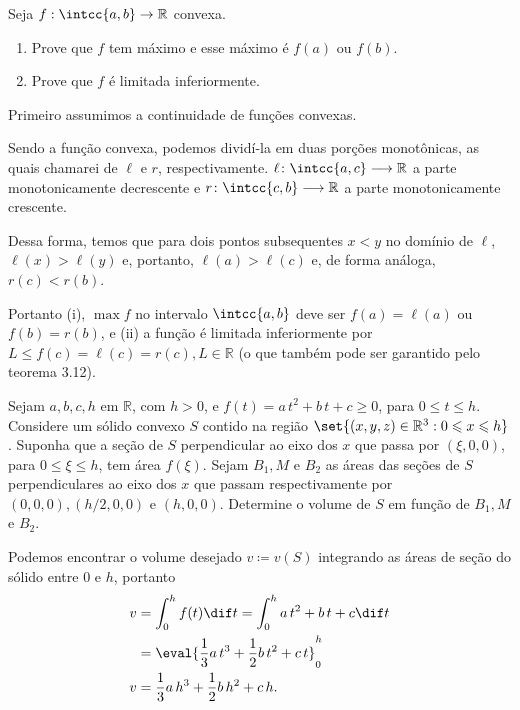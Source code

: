 \documentclass{IMTexam}
\begin{document}
\begin{questions}
		
		Seja $ f : \intcc{a,b} \to \mathbb{R} $ convexa.
		\begin{enumerate}[label=\roman*.]
			\item Prove que $ f $ tem máximo e esse máximo é $ f(a) $ ou $ f(b) $.
			\item Prove que $ f $ é limitada inferiormente.
		\end{enumerate}
	
		\begin{solution}
			Primeiro assumimos a continuidade de funções convexas.
			
			Sendo a função convexa, podemos dividí-la em duas porções monotônicas, as quais chamarei de $ \ell $ e $ r $, respectivamente. $ \ell\colon\intcc{a,c}\longrightarrow\mathbb{R} $ a parte monotonicamente decrescente e $ r\colon\intcc{c,b}\longrightarrow\mathbb{R} $ a parte monotonicamente crescente.
			
			Dessa forma, temos que para dois pontos subsequentes $ x<y $ no domínio de $ \ell $, $ \ell(x)>\ell(y) $ e, portanto, $ \ell(a)>\ell(c) $ e, de forma análoga, $ r(c)< r(b) $. 
			
			Portanto (i), $ \max f $ no intervalo $ \intcc{a,b} $ deve ser $ f(a)=\ell(a) $ ou $ f(b)=r(b) $, e (ii) a função é limitada inferiormente por $ L\leqslant f(c)=\ell(c)=r(c), L\in\mathbb{R} $ (o que também pode ser garantido pelo teorema 3.12).
		\end{solution}
		
		
		Sejam $ a, b, c, h $ em $ \mathbb{R} $, com $ h > 0 $, e $ f(t) = a\,t^{2} + b\,t + c \geqslant 0 $, para $ 0 \leqslant t \leqslant h $. Considere um sólido convexo $ S $ contido na região $ \set{(x, y, z) \in \mathbb{R}^{3} : 0 \leqslant x \leqslant h} $. Suponha que a seção de $ S $ perpendicular ao eixo dos $ x $ que passa por $ (\xi, 0, 0) $, para $ 0 \leqslant \xi \leqslant h $, tem área $ f(\xi) $. Sejam $ B_1, M $ e $ B_2 $ as áreas das seções de $ S $ perpendiculares ao eixo dos $ x $ que passam respectivamente por $ (0, 0, 0), (h/2, 0, 0) $ e $ (h, 0, 0) $. Determine o volume de $ S $ em função de $ B_1, M $ e $ B_2 $.
		
		\begin{solution}
			Podemos encontrar o volume desejado $ v\coloneq v(S) $ integrando as áreas de seção do sólido entre $ 0 $ e $ h $, portanto
			\begin{align}
				v&=\int_{0}^{h}f(t)\dif t=\int_{0}^{h}a\,t^{2}+b\,t+c\dif t\nonumber\\
				&=\eval{\dfrac{1}{3}a\,t^{3}+\dfrac{1}{2}b\,t^{2}+c\,t}_{0}^{h}\nonumber\\
				v&=\dfrac{1}{3}a\,h^{3}+\dfrac{1}{2}b\,h^{2}+c\,h.\label{eq:int}
			\end{align}
			

\end{solution}
\end{questions}
\end{document}
